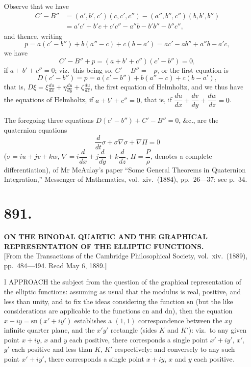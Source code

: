 \documentclass[11pt,a4paper]{book}
\providecommand{\sn}{\mathrm{sn}}
\providecommand{\cn}{\mathrm{cn}}
\providecommand{\dn}{\mathrm{dn}}
\begin{document}
Observe that we have
\begin{align*}
C' - B'' &= (a', b', c')(c, c', c'') - (a'', b'', c'')(b, b', b'') \\
&= a'c' + b'c + c'c'' - a''b - b'b'' - b''c'',
\end{align*}
and thence, writing
\[
p = a(c' - b'') + b(a'' - c) + c(b - a') = ac' - ab'' + a''b - a'c,
\]
we have
\[
C' - B'' + p = (a + b' + c'')(c' - b'') = 0,
\]
if $a + b' + c'' = 0$; viz.\ this being so, $C' - B'' = -p$, or the first equation is
\[
D(c' - b'') = p = a(c' - b'') + b(a'' - c) + c(b - a'),
\]
that is, $\displaystyle D\xi = \xi\frac{du}{dx} + \eta\frac{du}{dy} + \zeta\frac{du}{dz}$, the first equation of Helmholtz, and we thus have the equations of Helmholtz, if $a + b' + c'' = 0$, that is, if $\dfrac{du}{dx} + \dfrac{dv}{dy} + \dfrac{dw}{dz} = 0$.

The foregoing three equations $D(c' - b'') + C' - B'' = 0$, \&c., are the quaternion equations
\[
\frac{d}{dt}\sigma + \sigma\nabla \sigma + \nabla\Pi = 0
\]
($\sigma = iu + jv + kw$, $\nabla = i\dfrac{d}{dx} + j\dfrac{d}{dy} + k\dfrac{d}{dz}$, $\Pi = \dfrac{P}{\rho}$, denotes a complete differentiation), of Mr McAulay's paper ``Some General Theorems in Quaternion Integration,'' Messenger of Mathematics, vol.\ xiv.\ (1884), pp.\ 26---37; see p.\ 34.


\section*{891.}
\begin{center}
{\large\bfseries ON THE BINODAL QUARTIC AND THE GRAPHICAL REPRESENTATION OF THE ELLIPTIC FUNCTIONS.}\\[0.5em]
\small [From the Transactions of the Cambridge Philosophical Society, vol.\ xiv.\ (1889), pp.\ 484---494. Read May 6, 1889.]
\end{center}

I APPROACH the subject from the question of the graphical representation of the elliptic functions: assuming as usual that the modulus is real, positive, and less than unity, and to fix the ideas considering the function $\sn$ (but the like considerations are applicable to the functions $\cn$ and $\dn$), then the equation $x + iy = \sn(x' + iy')$ establishes a $(1, 1)$ correspondence between the $xy$ infinite quarter plane, and the $x'y'$ rectangle (sides $K$ and $K'$): viz.\ to any given point $x + iy$, $x$ and $y$ each positive, there corresponds a single point $x' + iy'$, $x'$, $y'$ each positive and less than $K$, $K'$ respectively: and conversely to any such point $x' + iy'$, there corresponds a single point $x + iy$, $x$ and $y$ each positive.
\end{document}
